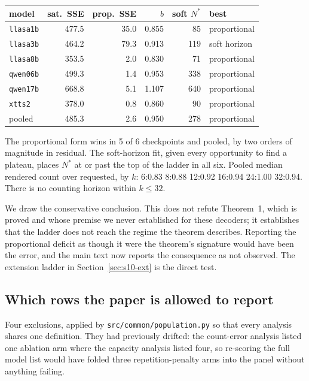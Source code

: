 \documentclass[11pt]{article}
\begin{document}
\begin{center}
\begin{tabular}{lrrrrl}
\toprule
model & sat.\ SSE & prop.\ SSE & $b$ & soft $N^\ast$ & best \\
\midrule
\texttt{llasa1b} & 477.5 & 35.0 & 0.855 & 85 & proportional \\
\texttt{llasa3b} & 464.2 & 79.3 & 0.913 & 119 & soft horizon \\
\texttt{llasa8b} & 353.5 & 2.0 & 0.830 & 71 & proportional \\
\texttt{qwen06b} & 499.3 & 1.4 & 0.953 & 338 & proportional \\
\texttt{qwen17b} & 668.8 & 5.1 & 1.107 & 640 & proportional \\
\texttt{xtts2} & 378.0 & 0.8 & 0.860 & 90 & proportional \\
\midrule
pooled & 485.3 & 2.6 & 0.950 & 278 & proportional \\
\bottomrule
\end{tabular}
\end{center}

\noindent The proportional form wins in 5 of 6 checkpoints and pooled, by two
orders of magnitude in residual. The soft-horizon fit, given every opportunity to
find a plateau, places $N^\ast$ at or past the top of the ladder in all six.
Pooled median rendered count over requested, by $k$: 6:0.83 8:0.88 12:0.92 16:0.94 24:1.00 32:0.94. There is no counting
horizon within $k\le32$.

We draw the conservative conclusion. This does not refute Theorem~1, which is
proved and whose premise we never established for these decoders; it establishes
that the ladder does not reach the regime the theorem describes. Reporting the
proportional deficit as though it were the theorem's signature would have been
the error, and the main text now reports the consequence as not observed. The
extension ladder in Section~\ref{sec:s10-ext} is the direct test.

\subsection{Which rows the paper is allowed to report}
\label{sec:s10-pop}

Four exclusions, applied by \texttt{src/common/population.py} so that every
analysis shares one definition. They had previously drifted: the count-error
analysis listed one ablation arm where the capacity analysis listed four, so
re-scoring the full model list would have folded three repetition-penalty arms
into the panel without anything failing.
\end{document}
